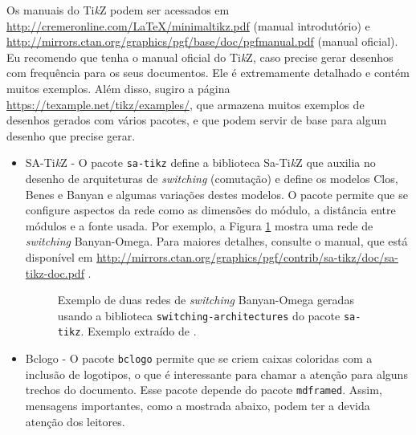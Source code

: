 Os manuais do Ti\textit{k}Z podem ser acessados em \url{http://cremeronline.com/LaTeX/minimaltikz.pdf} \parencite{tikzintro} (manual introdutório) e \url{http://mirrors.ctan.org/graphics/pgf/base/doc/pgfmanual.pdf} \parencite{tikz} (manual oficial). Eu recomendo que tenha o manual oficial do Ti\textit{k}Z, caso precise gerar desenhos com frequência para os seus documentos. Ele é extremamente detalhado e contém muitos exemplos. Além disso, sugiro a página \url{https://texample.net/tikz/examples/}, que armazena muitos exemplos de desenhos gerados com vários pacotes, e que podem servir de base para algum desenho que precise gerar.

\begin{itemize}
	\item SA-Ti\textit{k}Z - O pacote \texttt{sa-tikz} define a biblioteca Sa-Ti\textit{k}Z que auxilia no desenho de arquiteturas de \textit{switching} (comutação) e define os modelos Clos, Benes e Banyan e algumas variações destes modelos. O pacote permite que se configure aspectos da rede como as dimensões do módulo, a distância entre módulos e a fonte usada. Por exemplo, a Figura \ref{fig:redeBanyan} mostra uma rede de \textit{switching} Banyan-Omega. Para maiores detalhes, consulte o manual, que está disponível em \url{http://mirrors.ctan.org/graphics/pgf/contrib/sa-tikz/doc/sa-tikz-doc.pdf} \parencite{sa-tikz}.

\begin{figure}[htb]
	\begin{center}
	\end{center}
	\caption{Exemplo de duas redes de \textit{switching} Banyan-Omega geradas usando a biblioteca \texttt{switching-architectures} do pacote \texttt{sa-tikz}. Exemplo extraído de \parencite{sa-tikz}.}
	\label{fig:redeBanyan}
\end{figure}

\item Bclogo - O pacote \texttt{bclogo} permite que se criem caixas coloridas com a inclusão de logotipos, o que é interessante para chamar a atenção para alguns trechos do documento. Esse pacote depende do pacote \texttt{mdframed}. Assim, mensagens importantes, como a mostrada abaixo, podem ter a devida atenção dos leitores.


\end{itemize}
